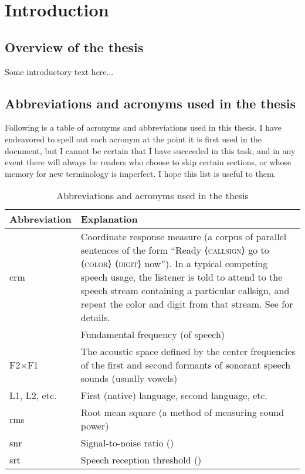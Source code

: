 \chapter{Introduction}
\section[Overview]{Overview of the thesis \label{sec:Overview}}
Some introductory text here...

\section[Abbreviations \& acronyms]{Abbreviations and acronyms used in the thesis \label{sec:Abbr}}
Following is a table of acronyms and abbreviations used in this thesis.  I have endeavored to spell out each acronym at the point it is first used in the document, but I cannot be certain that I have succeeded in this task, and in any event there will always be readers who choose to skip certain sections, or whose memory for new terminology is imperfect.  I hope this list is useful to them.

\begin{table}
	\caption[Abbreviations and acronyms]{Abbreviations and acronyms used in the thesis \label{tab:Abbr}}
	\centering
	\begin{tabu} to \textwidth [c]{X[c] X[5]}
		\toprule
		\rowfont[c]{\bfseries} Abbreviation & Explanation\\
		\midrule
		\ac{crm} & Coordinate response measure (a corpus of parallel sentences of the form “Ready ⟨\textsc{callsign}⟩ go to ⟨\textsc{color}⟩ ⟨\textsc{digit}⟩ now”).  In a typical competing speech usage, the listener is told to attend to the speech stream containing a particular callsign, and repeat the color and digit from that stream.  See \citet{BoliaEtAl2000} for details.\\
		\fo & Fundamental frequency (of speech)\\
		F2×F1 & The acoustic space defined by the center frequencies of the first and second formants of sonorant speech sounds (usually vowels)\\
		L1, L2, etc. & First (native) language, second language, etc.\\
		\ac{rms} & Root mean square (a method of measuring sound power)\\
		\ac{snr} & Signal-to-noise ratio ()\\
		\ac{srt} & Speech reception threshold ()\\
		\bottomrule
	\end{tabu}
\end{table}
